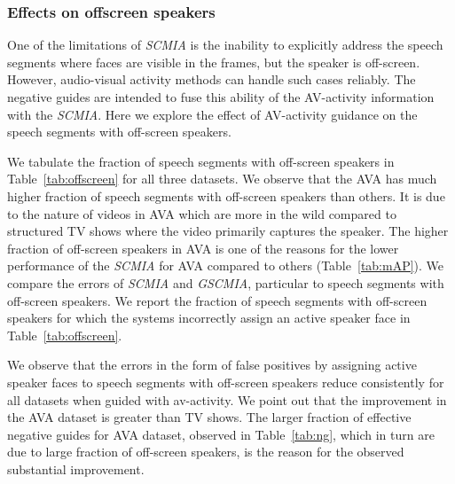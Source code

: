 \subsubsection{Effects on offscreen speakers}
One of the limitations of \emph{SCMIA} is the inability to explicitly address the speech segments where faces are visible in the frames, but the speaker is off-screen. However, audio-visual activity methods can handle such cases reliably. The negative guides are intended to fuse this ability of the AV-activity information with the \emph{SCMIA}. Here we explore the effect of AV-activity guidance on the speech segments with off-screen speakers.

We tabulate the fraction of speech segments with off-screen speakers in Table~\ref{tab:offscreen} for all three datasets. We observe that the AVA has much higher fraction of speech segments with off-screen speakers than others. It is due to the nature of videos in AVA which are more in the wild compared to structured TV shows where the video primarily captures the speaker. The higher fraction of off-screen speakers in AVA is one of the reasons for the lower performance of the \emph{SCMIA} for AVA compared to others (Table~\ref{tab:mAP}). We compare the errors of \emph{SCMIA} and \emph{GSCMIA}, particular to speech segments with off-screen speakers. We report the fraction of speech segments with off-screen speakers for which the systems incorrectly assign an active speaker face in Table~\ref{tab:offscreen}.
\begin{table}[]
\centering
\caption{Effect of using the Negative guides: performance enhancement for speech segments with off-screen speakers.}
\label{tab:offscreen}
\end{table}

We observe that the errors in the form of false positives by assigning active speaker faces to speech segments with off-screen speakers reduce consistently for all datasets when guided with av-activity. We point out that the improvement in the AVA dataset is greater than TV shows. The larger fraction of effective negative guides for AVA dataset, observed in Table~\ref{tab:ng}, which in turn are due to large fraction of off-screen speakers, is the reason for the observed substantial improvement.


